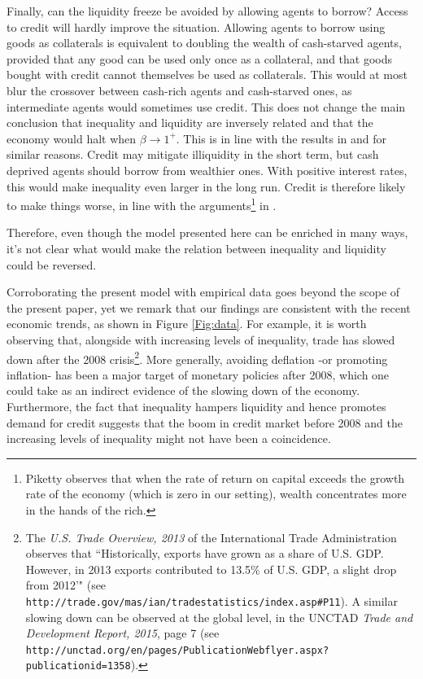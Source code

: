 Finally, can the liquidity freeze be avoided by allowing agents to borrow? Access to credit will hardly improve the situation. Allowing agents to borrow using goods as collaterals is equivalent to doubling the
wealth of cash-starved agents, provided that any good can be used only once as a collateral, and that goods bought with credit cannot themselves be used as collaterals.  This would at most blur the crossover between cash-rich agents and cash-starved ones, as intermediate agents would sometimes use credit. This does not change the main conclusion that inequality and liquidity are inversely related and that the economy would halt when $\beta \to 1^{+}$. This is in line with the results in \cite{Yakovenko2009Review} and for similar reasons. Credit may mitigate illiquidity in the short term, but cash deprived agents should borrow from wealthier ones. With positive interest rates, this would make inequality even larger in the long run. Credit is therefore likely to make things worse, in line with the arguments\footnote{Piketty \cite{Piketty2014} observes that when the rate of return on capital exceeds the growth rate of the economy (which is zero in our setting), wealth concentrates more in the hands of the rich.} in \cite{Piketty2014}.

Therefore, even though the model presented here can be enriched in many ways, it's not clear what would make the relation between inequality and liquidity could be reversed. 

Corroborating the present model with empirical data goes beyond the scope of the present paper, yet we remark that our findings are consistent with the recent economic trends, as shown in Figure \ref{Fig:data}.  For example, it is worth observing that, alongside with increasing levels of inequality, trade 
has slowed down after the 2008 crisis\footnote{The {\em U.S. Trade Overview, 2013} of the International Trade Administration observes that ``Historically, exports have grown as a share of U.S. GDP. However, in 2013 exports contributed to 13.5\% of U.S. GDP, a slight drop from 2012'" (see {\tt http://trade.gov/mas/ian/tradestatistics/index.asp{\#P}11}). A similar slowing down can be observed at the global level, in the UNCTAD {\em Trade and Development Report, 2015}, page 7 (see {\tt http://unctad.org/en/pages/PublicationWebflyer.aspx?publicationid=1358}).}. More generally, avoiding deflation -or promoting inflation- has been a major target of monetary policies after 2008, which one could take as an indirect evidence of the slowing down of the economy.  Furthermore, the fact that inequality hampers liquidity and hence promotes demand for credit suggests that the boom in credit market before 2008 and the increasing levels of inequality might not have been a coincidence. 

